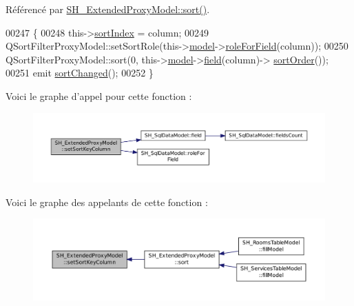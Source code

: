 Référencé par \hyperlink{classSH__ExtendedProxyModel_a5ed9b14df78667efe8b22d19617d6c4b}{S\-H\-\_\-\-Extended\-Proxy\-Model\-::sort()}.


\begin{DoxyCode}
00247 \{
00248     this->\hyperlink{classSH__ExtendedProxyModel_a83cabe4cf90a26d26c4aaa40e944b2bd}{sortIndex} = column;
00249     QSortFilterProxyModel::setSortRole(this->\hyperlink{classSH__ExtendedProxyModel_a8c8b8930c6b1abd9bbb1dce1fdc9690b}{model}->\hyperlink{classSH__SqlDataModel_a0e05155c3c22c6fef7b91ec57d383ae5}{roleForField}(column));
00250     QSortFilterProxyModel::sort(0, this->\hyperlink{classSH__ExtendedProxyModel_a8c8b8930c6b1abd9bbb1dce1fdc9690b}{model}->\hyperlink{classSH__SqlDataModel_a442cdea9007cb61ed9d2fbdd01ddccbf}{field}(column)->
      \hyperlink{classSH__SqlDataFields_aec4483df7b9edfe22100985047d97bdd}{sortOrder}());
00251     emit \hyperlink{classSH__ExtendedProxyModel_a573590c2763d06d07c6509d4c91a06b2}{sortChanged}();
00252 \}
\end{DoxyCode}


Voici le graphe d'appel pour cette fonction \-:
\nopagebreak
\begin{figure}[H]
\begin{center}
\leavevmode
\includegraphics[width=350pt]{classSH__ExtendedProxyModel_ad1eb97a28d23e9aba8174bd5ffd7a5e4_cgraph}
\end{center}
\end{figure}




Voici le graphe des appelants de cette fonction \-:
\nopagebreak
\begin{figure}[H]
\begin{center}
\leavevmode
\includegraphics[width=350pt]{classSH__ExtendedProxyModel_ad1eb97a28d23e9aba8174bd5ffd7a5e4_icgraph}
\end{center}
\end{figure}


